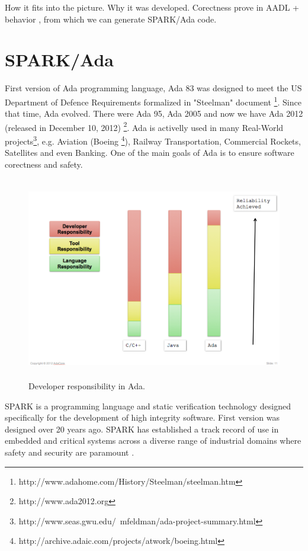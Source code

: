 How it fits into the picture. Why it was developed. Corectness prove in AADL + behavior \cite{Bless:Paper}, from which we can generate SPARK/Ada code.



\section{SPARK/Ada}
\label{background:spark}

First version of Ada programming language, Ada 83 was designed to meet the US Department of Defence Requirements formalized in "Steelman" document \footnote{http://www.adahome.com/History/Steelman/steelman.htm}. Since that time, Ada evolved. There were Ada 95, Ada 2005 and now we have Ada 2012 (released in December 10, 2012) \footnote{http://www.ada2012.org}. Ada is activelly used in many Real-World projects\footnote{http://www.seas.gwu.edu/~mfeldman/ada-project-summary.html}, e.g. Aviation (Boeing \footnote{http://archive.adaic.com/projects/atwork/boeing.html}), Railway Transportation, Commercial Rockets, Satellites and even Banking. One of the main goals of Ada is to ensure software corectness and safety.

\begin{figure}[ht]%
    \begin{center}
    	\includegraphics[height=3.5in]{figures/developer_responsibility_in_ada.png}
    	\caption{Developer responsibility in Ada\protect\footnotemark. }    	
    \end{center}
\end{figure}

SPARK is a programming language and static verification technology designed specifically for the development of high integrity software. First version was designed over 20 years ago. SPARK has established a track record of use in embedded and critical systems across a diverse range of industrial domains where safety and security are paramount \cite{Barnes:Book}. 

